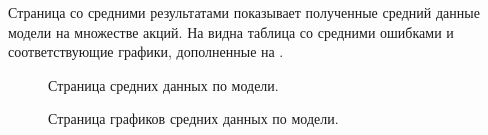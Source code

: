\documentclass[12pt, a4paper]{article}
\begin{document}
Страница со средними результатами показывает полученные средний данные модели на множестве акций. На  видна таблица со средними ошибками и соответствующие графики, дополненные на .
\begin{figure}[!h]
\caption{Страница средних данных по модели.}
\label{fig:mean}
\end{figure}
\begin{figure}[!h]
\caption{Страница графиков средних данных по модели.}
\label{fig:mean_other}
\end{figure}
\end{document}
